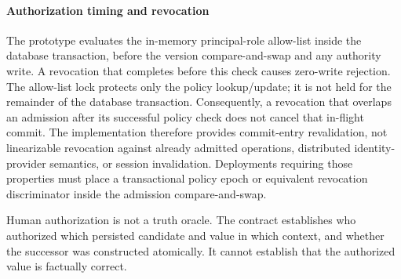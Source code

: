 \paragraph{Authorization timing and revocation}
\label{sec:authorization-timing}
The prototype evaluates the in-memory principal-role allow-list inside the database transaction, before the version compare-and-swap and any authority write. A revocation that completes before this check causes zero-write rejection. The allow-list lock protects only the policy lookup/update; it is not held for the remainder of the database transaction. Consequently, a revocation that overlaps an admission after its successful policy check does not cancel that in-flight commit. The implementation therefore provides commit-entry revalidation, not linearizable revocation against already admitted operations, distributed identity-provider semantics, or session invalidation. Deployments requiring those properties must place a transactional policy epoch or equivalent revocation discriminator inside the admission compare-and-swap.

Human authorization is not a truth oracle. The contract establishes who authorized which persisted candidate and value in which context, and whether the successor was constructed atomically. It cannot establish that the authorized value is factually correct.



